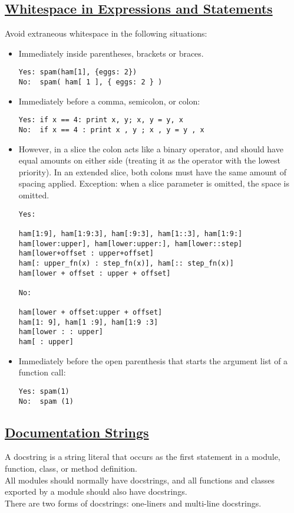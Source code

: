 \documentclass[a4paper]{report}
\begin{document}
\subsection{\href{https://www.python.org/dev/peps/pep-0008/\#whitespace-in-expressions-and-statements}{Whitespace in Expressions and Statements}}
Avoid extraneous whitespace in the following situations:
\begin{itemize}
\item Immediately inside parentheses, brackets or braces.
\begin{verbatim}
Yes: spam(ham[1], {eggs: 2})
No:  spam( ham[ 1 ], { eggs: 2 } )
\end{verbatim}
\item Immediately before a comma, semicolon, or colon:
\begin{verbatim}
Yes: if x == 4: print x, y; x, y = y, x
No:  if x == 4 : print x , y ; x , y = y , x
\end{verbatim}
\item However, in a slice the colon acts like a binary operator, and should have equal amounts on either side (treating it as the operator with the lowest priority). In an extended slice, both colons must have the same amount of spacing applied. Exception: when a slice parameter is omitted, the space is omitted.
\begin{verbatim}
Yes:

ham[1:9], ham[1:9:3], ham[:9:3], ham[1::3], ham[1:9:]
ham[lower:upper], ham[lower:upper:], ham[lower::step]
ham[lower+offset : upper+offset]
ham[: upper_fn(x) : step_fn(x)], ham[:: step_fn(x)]
ham[lower + offset : upper + offset]

No:

ham[lower + offset:upper + offset]
ham[1: 9], ham[1 :9], ham[1:9 :3]
ham[lower : : upper]
ham[ : upper]
\end{verbatim}
\item Immediately before the open parenthesis that starts the argument list of a function call:
\begin{verbatim}
Yes: spam(1)
No:  spam (1)
\end{verbatim}
\end{itemize}

\subsection{\href{https://www.python.org/dev/peps/pep-0257/}{Documentation Strings}}
\label{subsec:docstrings}
A docstring is a string literal that occurs as the first statement in a module, function, class, or method definition.\\
All modules should normally have docstrings, and all functions and classes exported by a module should also have docstrings.\\
There are two forms of docstrings: one-liners and multi-line docstrings.\\
\end{document}
